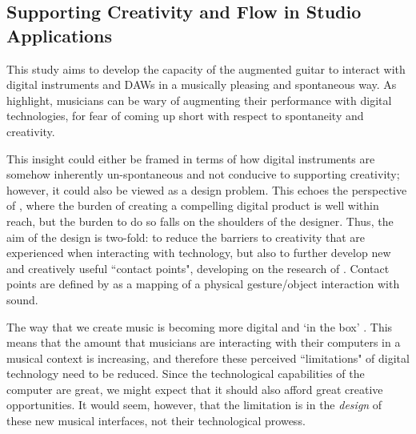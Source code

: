 \subsection{Supporting Creativity and Flow in Studio Applications}
This study aims to develop the capacity of the augmented guitar to interact with digital instruments and DAWs in a musically pleasing and spontaneous way. As \cite{martelloni_percussive_2020} highlight, musicians can be wary of augmenting their performance with digital technologies, for fear of coming up short with respect to spontaneity and creativity.

This insight could either be framed in terms of how digital instruments are somehow inherently un-spontaneous and not conducive to supporting creativity; however, it could also be viewed as a design problem. This echoes the perspective of \cite{norman_design_2013}, where the burden of creating a compelling digital product is well within reach, but the burden to do so falls on the shoulders of the designer. Thus, the aim of the design is two-fold: to reduce the barriers to creativity that are experienced when interacting with technology, but also to further develop new and creatively useful ``contact points", developing on the research of \cite{lahdeoja_approach_2008}. Contact points are defined by \cite{lahdeoja_approach_2008} as a mapping of a physical gesture/object interaction with sound.

The way that we create music is becoming more digital and `in the box' \citep{nash_supporting_2012}. This means that the amount that musicians are interacting with their computers in a musical context is increasing, and therefore these perceived ``limitations" of digital technology need to be reduced. Since the technological capabilities of the computer are great, we might expect that it should also afford great creative opportunities. It would seem, however, that the limitation is in the \textit{design} of these new musical interfaces, not their technological prowess.